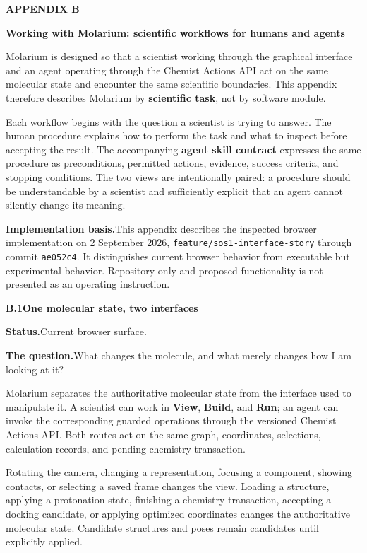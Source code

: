\documentclass[10pt,letterpaper]{article}
\newcommand{\code}[1]{\texttt{#1}}
\newcommand{\lead}[1]{\textbf{#1}\hspace{0.35em}}
\newcommand{\workflowsection}[4]{%
  \par\needspace{5\baselineskip}\vspace{7.5pt}%
  {\fontsize{10.91}{13.1}\selectfont\bfseries #1\hspace{1.1em}#2}\par\vspace{2pt}%
  \lead{Status.}#3.\par\vspace{-3.5pt}%
  \lead{The question.}#4\par}
\begin{document}
\begin{center}
{\color{molariumblue}\fontsize{14.35}{17}\selectfont\bfseries APPENDIX B\par}
\vspace{2pt}
{\color{molariumblue}\fontsize{17.22}{20.5}\selectfont\bfseries
Working with Molarium: scientific workflows for humans and agents\par}
\end{center}
\vspace{11pt}

Molarium is designed so that a scientist working through the graphical interface and an agent operating through the Chemist Actions API act on the same molecular state and encounter the same scientific boundaries. This appendix therefore describes Molarium by \textbf{scientific task}, not by software module.

Each workflow begins with the question a scientist is trying to answer. The human procedure explains how to perform the task and what to inspect before accepting the result. The accompanying \textbf{agent skill contract} expresses the same procedure as preconditions, permitted actions, evidence, success criteria, and stopping conditions. The two views are intentionally paired: a procedure should be understandable by a scientist and sufficiently explicit that an agent cannot silently change its meaning.

\lead{Implementation basis.}This appendix describes the inspected browser implementation on 2 September 2026, \code{feature/sos1-interface-story} through commit \code{ae052c4}. It distinguishes current browser behavior from executable but experimental behavior. Repository-only and proposed functionality is not presented as an operating instruction.

\workflowsection{B.1}{One molecular state, two interfaces}{Current browser surface}{What changes the molecule, and what merely changes how I am looking at it?}

Molarium separates the authoritative molecular state from the interface used to manipulate it. A scientist can work in \textbf{View}, \textbf{Build}, and \textbf{Run}; an agent can invoke the corresponding guarded operations through the versioned Chemist Actions API. Both routes act on the same graph, coordinates, selections, calculation records, and pending chemistry transaction.

Rotating the camera, changing a representation, focusing a component, showing contacts, or selecting a saved frame changes the view. Loading a structure, applying a protonation state, finishing a chemistry transaction, accepting a docking candidate, or applying optimized coordinates changes the authoritative molecular state. Candidate structures and poses remain candidates until explicitly applied.
\end{document}
